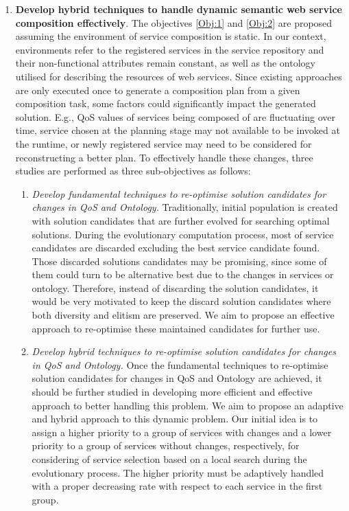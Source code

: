 \begin{enumerate}
\begin{enumerate}
   \end{enumerate}
  
 \item \textbf{Develop hybrid techniques to handle dynamic semantic web service composition effectively}. The objectives \ref{Obj:1} and \ref{Obj:2} are proposed assuming the environment of service composition is static. In our context, environments refer to the registered services in the service repository and their non-functional attributes remain constant, as well as the ontology utilised for describing the resources of web services. Since existing approaches are only executed once to generate a composition plan from a given composition task, some factors could significantly impact the generated solution. E.g., QoS values of services being composed of are fluctuating over time, service chosen at the planning stage may not available to be invoked at the runtime, or newly registered service may need to be considered for reconstructing a better plan. To effectively handle these changes, three studies are performed as three sub-objectives as follows:

  \begin{enumerate}
 \item \emph{Develop fundamental techniques to re-optimise solution candidates for changes in QoS and Ontology.} Traditionally, initial population is created with solution candidates that are further evolved for searching optimal solutions. During the evolutionary computation process, most of service candidates are discarded excluding the best service candidate found. Those discarded solutions candidates may be promising, since some of them could turn to be alternative best due to the changes in services or ontology. Therefore, instead of discarding the solution candidates, it would be very motivated to keep the discard solution candidates where both diversity and elitism are preserved. We aim to propose an effective approach to re-optimise these maintained candidates for further use.

 \item \emph{Develop hybrid techniques to re-optimise solution candidates for changes in QoS and Ontology.} Once the fundamental techniques to re-optimise solution candidates for changes in QoS and Ontology are achieved,  it should be further studied in developing more efficient and effective approach to better handling this problem. We aim to propose an adaptive and hybrid approach to this dynamic problem. Our initial idea is to assign a higher priority to a group of services with changes and a lower priority to a group of services without changes, respectively, for considering of service selection based on a local search during the evolutionary process. The higher priority must be adaptively handled with a proper decreasing rate with respect to each service in the first group.
 

\end{enumerate}
\end{enumerate}
